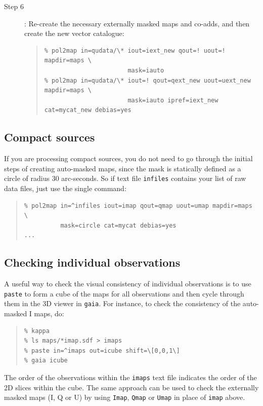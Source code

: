 \documentclass[twoside,11pt]{starlink}
\begin{document}
\begin{description}
\item[Step 6]: Re-create the necessary externally masked maps and co-adds,
and then create the new vector catalogue:

\begin{quote}
\begin{verbatim}
% pol2map in=qudata/\* iout=iext_new qout=! uout=! mapdir=maps \
                       mask=iauto
% pol2map in=qudata/\* iout=! qout=qext_new uout=uext_new mapdir=maps \
                       mask=iauto ipref=iext_new cat=mycat_new debias=yes
\end{verbatim}
\end{quote}

\end{description}

\subsection{Compact sources}
If you are processing compact sources, you do not need to go through the
initial steps of creating auto-masked maps, since the mask is statically
defined as a circle of radius 30 arc-seconds. So if text file
\texttt{infiles} contains your list of raw data files, just use the
single command:

\begin{quote}
\begin{verbatim}
% pol2map in=^infiles iout=imap qout=qmap uout=umap mapdir=maps \
          mask=circle cat=mycat debias=yes
...
\end{verbatim}
\end{quote}

\subsection{Checking individual observations}
A useful way to check the visual consistency of individual observations
is to use \texttt{paste} to form a cube of the maps for all observations and
then cycle through
them in the 3D viewer in \texttt{gaia}. For instance, to check the
consistency of the auto-masked I maps, do:

\begin{quote}
\begin{verbatim}
% kappa
% ls maps/*imap.sdf > imaps
% paste in=^imaps out=icube shift=\[0,0,1\]
% gaia icube
\end{verbatim}
\end{quote}

The order of the observations within the \texttt{imaps} text file
indicates the order of the 2D slices within the cube. The same approach
can be used to check the externally masked maps (I, Q or U) by using
\texttt{Imap}, \texttt{Qmap} or \texttt{Umap} in place of \texttt{imap}
above.
\end{document}
